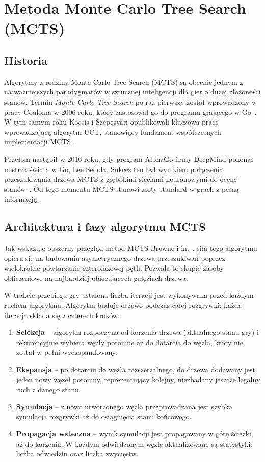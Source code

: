 \documentclass{article}
\begin{document}
\section{Metoda Monte Carlo Tree Search (MCTS)}

\subsection{Historia}

Algorytmy z rodziny Monte Carlo Tree Search (MCTS) są obecnie jednym
z najważniejszych paradygmatów w sztucznej inteligencji dla gier o dużej
złożoności stanów. Termin \emph{Monte Carlo Tree Search} po raz pierwszy
został wprowadzony w pracy Couloma w 2006 roku, który zastosował go do
programu grającego w Go~\cite{Coulom2006}. W tym samym roku Kocsis
i Szepesvári opublikowali kluczową pracę wprowadzającą algorytm UCT,
stanowiący fundament współczesnych implementacji MCTS~\cite{Kocsis2006}.

Przełom nastąpił w 2016 roku, gdy program AlphaGo firmy DeepMind pokonał
mistrza świata w Go, Lee Sedola. Sukces ten był wynikiem połączenia
przeszukiwania drzewa MCTS z głębokimi sieciami neuronowymi do oceny
stanów~\cite{Silver2016}. Od tego momentu MCTS stanowi złoty standard
w grach z pełną informacją.

\subsection{Architektura i fazy algorytmu MCTS}

Jak wskazuje obszerny przegląd metod MCTS Browne i in.~\cite{Browne2012},
siła tego algorytmu opiera się na budowaniu asymetrycznego drzewa
przeszukiwań poprzez wielokrotne powtarzanie czterofazowej pętli.
Pozwala to skupić zasoby obliczeniowe na najbardziej obiecujących
gałęziach drzewa.

W trakcie przebiegu gry ustalona liczba iteracji jest wykonywana przed
każdym ruchem algorytmu. Algorytm buduje drzewo podczas całej rozgrywki;
każda iteracja składa się z czterech kroków:

\begin{enumerate}
    \item \textbf{Selekcja} -- algorytm rozpoczyna od korzenia drzewa
    (aktualnego stanu gry) i rekurencyjnie wybiera węzły potomne aż do
    dotarcia do węzła, który nie został w pełni wyekspandowany.
    \item \textbf{Ekspansja} -- po dotarciu do węzła rozszerzalnego, do
    drzewa dodawany jest jeden nowy węzeł potomny, reprezentujący kolejny,
    niezbadany jeszcze legalny ruch z danego stanu.
    \item \textbf{Symulacja} -- z nowo utworzonego węzła przeprowadzana jest
    szybka symulacja rozgrywki aż do osiągnięcia stanu końcowego.
    \item \textbf{Propagacja wsteczna} -- wynik symulacji jest propagowany
    w górę ścieżki, aż do korzenia. W każdym odwiedzonym węźle aktualizowane
    są statystyki: liczba odwiedzin oraz liczba zwycięstw.
\end{enumerate}
\end{document}
